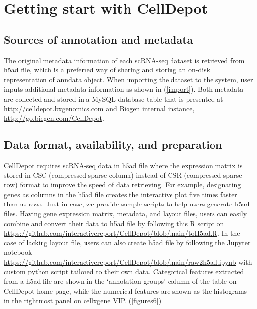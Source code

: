 \documentclass[
  openany]{book}
\begin{document}
\hypertarget{getting-start-with-celldepot}{%
\chapter{Getting start with CellDepot}\label{getting-start-with-celldepot}}

\hypertarget{sources-of-annotation-and-metadata}{%
\section{Sources of annotation and metadata}\label{sources-of-annotation-and-metadata}}

The original metadata information of each scRNA-seq dataset is retrieved from h5ad file, which is a preferred way of sharing and storing an on-disk representation of anndata object. When importing the dataset to the system, user inputs additional metadata information as shown in (\ref{import}). Both metadata are collected and stored in a MySQL database table that is presented at \url{http://celldepot.bxgenomics.com} and Biogen internal instance, \url{http://go.biogen.com/CellDepot}.

\hypertarget{data-format-availability-and-preparation}{%
\section{Data format, availability, and preparation}\label{data-format-availability-and-preparation}}

CellDepot requires scRNA-seq data in h5ad file where the expression matrix is stored in CSC (compressed sparse column) instead of CSR (compressed sparse row) format to improve the speed of data retrieving. For example, designating genes as columns in the h5ad file creates the interactive plot five times faster than as rows. Just in case, we provide sample scripts to help users generate h5ad files. Having gene expression matrix, metadata, and layout files, users can easily combine and convert their data to h5ad file by following this R script on \url{https://github.com/interactivereport/CellDepot/blob/main/toH5ad.R}. In the case of lacking layout file, users can also create h5ad file by following the Jupyter notebook \url{https://github.com/interactivereport/CellDepot/blob/main/raw2h5ad.ipynb} with custom python script tailored to their own data. Categorical features extracted from a h5ad file are shown in the `annotation groups' column of the table on CellDepot home page, while the numerical features are shown as the histograms in the rightmost panel on cellxgene VIP. (\ref{figures6})
\end{document}
